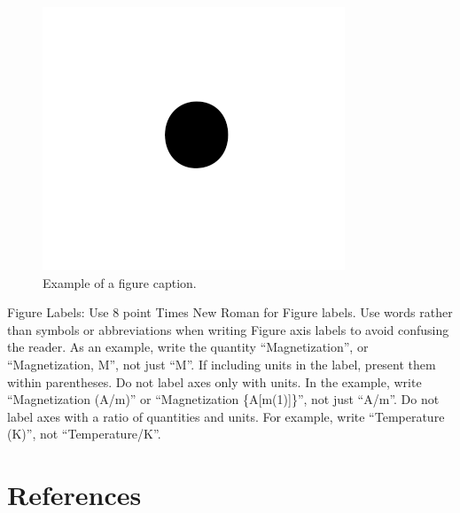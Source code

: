 \documentclass[conference]{IEEEtran}
\begin{document}
\begin{figure}[htbp]
\centerline{\includegraphics{fig1.png}}
\caption{Example of a figure caption.}
\label{fig}
\end{figure}

Figure Labels: Use 8 point Times New Roman for Figure labels. Use words 
rather than symbols or abbreviations when writing Figure axis labels to 
avoid confusing the reader. As an example, write the quantity 
``Magnetization'', or ``Magnetization, M'', not just ``M''. If including 
units in the label, present them within parentheses. Do not label axes only 
with units. In the example, write ``Magnetization (A/m)'' or ``Magnetization 
\{A[m(1)]\}'', not just ``A/m''. Do not label axes with a ratio of 
quantities and units. For example, write ``Temperature (K)'', not 
``Temperature/K''.

\section*{References}

%
%
\end{document}
